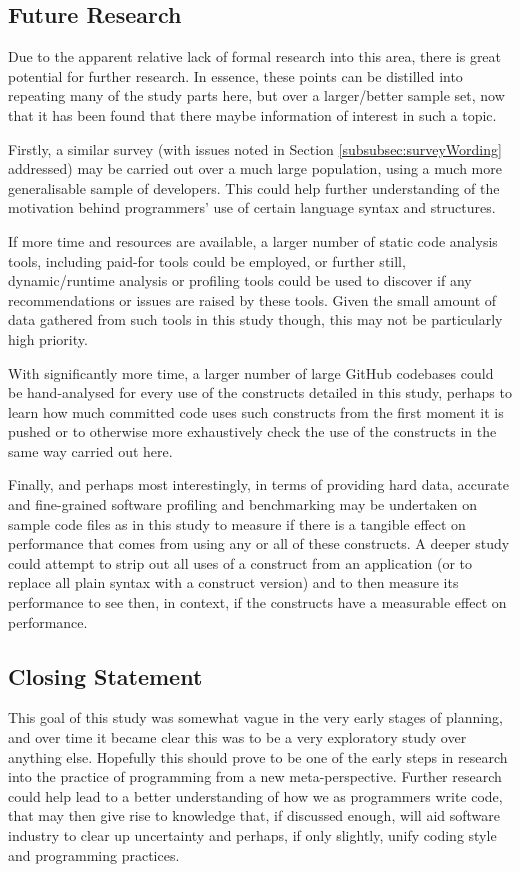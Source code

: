 \documentclass{article}
\begin{document}
    \subsection{Future Research}
        Due to the apparent relative lack of formal research into this area, there is great potential for further research. In essence, these points can be distilled into repeating many of the study parts here, but over a larger/better sample set, now that it has been found that there maybe information of interest in such a topic.
        
        Firstly, a similar survey (with issues noted in Section \ref{subsubsec:surveyWording} addressed) may be carried out over a much large population, using a much more generalisable sample of developers. This could help further understanding of the motivation behind programmers' use of certain language syntax and structures.
            
        If more time and resources are available, a larger number of static code analysis tools, including paid-for tools could be employed, or further still, dynamic/runtime analysis or profiling tools could be used to discover if any recommendations or issues are raised by these tools. Given the small amount of data gathered from such tools in this study though, this may not be particularly high priority.
        
        With significantly more time, a larger number of large GitHub codebases could be hand-analysed for every use of the constructs detailed in this study, perhaps to learn how much committed code uses such constructs from the first moment it is pushed or to otherwise more exhaustively check the use of the constructs in the same way carried out here.
            
        Finally, and perhaps most interestingly, in terms of providing hard data, accurate and fine-grained software profiling and benchmarking may be undertaken on sample code files as in this study to measure if there is a tangible effect on performance that comes from using any or all of these constructs. A deeper study could attempt to strip out all uses of a construct from an application (or to replace all plain syntax with a construct version) and to then measure its performance to see then, in context, if the constructs have a measurable effect on performance.
    \subsection{Closing Statement}
        This goal of this study was somewhat vague in the very early stages of planning, and over time it became clear this was to be a very exploratory study over anything else. Hopefully this should prove to be one of the early steps in research into the practice of programming from a new meta-perspective. Further research could help lead to a better understanding of how we as programmers write code, that may then give rise to knowledge that, if discussed enough,  will aid software industry to clear up uncertainty and perhaps, if only slightly, unify coding style and programming practices.
\end{document}
